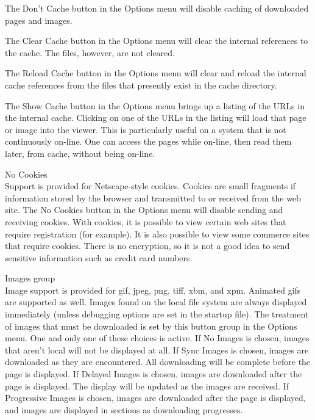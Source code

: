 \begin{description}
The {\cb Don't Cache} button in the {\cb Options} menu will disable
caching of downloaded pages and images.

The {\cb Clear Cache} button in the {\cb Options} menu will clear the
internal references to the cache.  The files, however, are not cleared.

The {\cb Reload Cache} button in the {\cb Options} menu will clear and
reload the internal cache references from the files that presently
exist in the cache directory.

The {\cb Show Cache} button in the {\cb Options} menu brings up a
listing of the URLs in the internal cache.  Clicking on one of the
URLs in the listing will load that page or image into the viewer.
This is particularly useful on a system that is not continuously
on-line.  One can access the pages while on-line, then read them
later, from cache, without being on-line.

\item{\cb No Cookies}\\
Support is provided for Netscape-style cookies.  Cookies are small
fragments if information stored by the browser and transmitted to or
received from the web site.  The {\cb No Cookies} button in the {\cb  
Options} menu will disable sending and receiving cookies.  With
cookies, it is possible to view certain web sites that require
registration (for example).  It is also possible to view some commerce
sites that require cookies.  There is no encryption, so it is not a
good idea to send sensitive information such as credit card numbers.

\item{\cb Images} group\\
Image support is provided for gif, jpeg, png, tiff, xbm, and xpm. 
Animated gifs are supported as well.  Images found on the local file
system are always displayed immediately (unless debugging options are
set in the startup file).  The treatment of images that must be
downloaded is set by this button group in the {\cb Options} menu.  One
and only one of these choices is active.  If {\cb No Images} is
chosen, images that aren't local will not be displayed at all.  If
{\cb Sync Images} is chosen, images are downloaded as they are
encountered.  All downloading will be complete before the page is
displayed.  If {\cb Delayed Images} is chosen, images are downloaded
after the page is displayed.  The display will be updated as the
images are received.  If {\cb Progressive Images} is chosen, images
are downloaded after the page is displayed, and images are displayed
in sections as downloading progresses.


\end{description}
